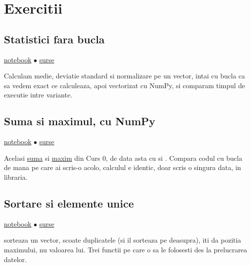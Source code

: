 \section{Exercitii}

\subsection{Statistici fara bucla}
\label{problem:statistici-vectorizate}

\href{notebooks/statistici-vectorizate.ipynb}{notebook}
$\bullet$
\hyperref[code:statistici-vectorizate]{surse}

Calculam medie, deviatie standard si normalizare pe un vector, intai cu
bucla  ca sa vedem exact ce calculeaza, apoi vectorizat cu
NumPy, si comparam timpul de executie intre variante.

\subsection{Suma si maximul, cu NumPy}
\label{problem:suma-maxim-numpy}

\href{notebooks/suma-maxim-numpy.ipynb}{notebook}
$\bullet$
\hyperref[code:suma-maxim-numpy]{surse}

Acelasi \hyperref[problem:suma-vector]{suma} si
\hyperref[problem:maxim-vector]{maxim} din Curs 0, de data asta cu
 si . Compara codul cu bucla de mana pe
care ai scris-o acolo, calculul e identic, doar scris o singura data,
in libraria.

\subsection{Sortare si elemente unice}
\label{problem:sortare-unice}

\href{notebooks/sortare-unice.ipynb}{notebook}
$\bullet$
\hyperref[code:sortare-unice]{surse}

 sorteaza un vector,  scoate
duplicatele (si il sorteaza pe deasupra),  iti da
pozitia maximului, nu valoarea lui. Trei functii pe care o sa le
folosesti des la prelucrarea datelor.

%
%

